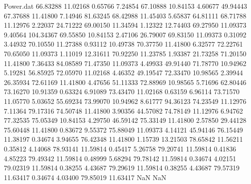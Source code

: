 \begin{filecontents}{Power.dat}
  66.83288   11.02168    0.65766    7.24854
  67.10888   10.84153    4.60677   49.94443
  67.37688   11.41800    7.14946   81.63245
  68.42988   11.45403    5.65837   64.81111
  68.71788   11.12976    2.22037   24.71222
  69.00150   11.34594    1.12322   12.74403
  69.27950   11.09373    9.40564  104.34367
  69.55850   10.84153    2.47106   26.79007
  69.83150   11.09373    0.31092    3.44932
  70.10550   11.27388    0.93112   10.49738
  70.37750   11.41800    6.32577   72.22761
  70.65050   11.09373    1.11019   12.31611
  70.92250   11.23785    1.93387   21.73258
  71.20150   11.41800    7.36433   84.08589
  71.47350   11.09373    4.49933   49.91440
  71.78770   10.94962    5.19281   56.85925
  72.05970   11.02168    4.46352   49.19547
  72.33470   10.98565    2.39944   26.35934
  72.61169   11.41800    4.47656   51.11333
  72.88969   10.98565    5.71696   62.80446
  73.16270   10.91359    0.63324    6.91089
  73.43470   11.02168    0.63159    6.96114
  73.71570   11.05770    5.03652   55.69234
  73.99070   10.94962    8.61777   94.36123
  74.23549   11.12976    7.11364   79.17316
  74.50748   11.41800    3.90356   44.57082
  74.78149   11.12976    6.94762   77.32535
  75.05349   10.84153    4.29750   46.59142
  75.33149   11.41800    2.57850   29.44128
  75.60448   11.41800    0.83672    9.55372
  75.88049   11.09373    4.14121   45.94146
  76.15449   11.38197    0.34674    3.94655
  76.42348   11.41800    1.15739   13.21503
  78.65842   11.56211    0.35812    4.14068
  78.93141   11.59814    0.45417    5.26758
  79.20741   11.59814    0.41836    4.85223
  79.49342   11.59814    0.48999    5.68294
  79.78142   11.59814    0.34674    4.02151
  79.02319   11.59814    0.38255    4.43687
  79.29619   11.59814    0.38255    4.43687
  79.57319   11.63417    0.34674    4.03400
  79.85019   11.63417        NaN        NaN
\end{filecontents}
